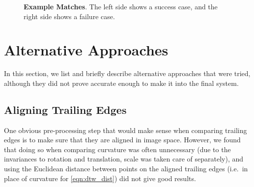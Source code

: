 \begin{figure}[t]%
\centering
{}
\newline
{}
\newline
{}
\newline
{}
\newline
{}
\newline
{}
\caption{\textbf{Example Matches}. The left side shows a success case, and the right side shows a failure case.} 
\label{fig:example_match}
\end{figure}

\section{Alternative Approaches}

In this section, we list and briefly describe alternative approaches that were tried, although they did not prove accurate enough to make it into the final system.

\subsection{Aligning Trailing Edges}

One obvious pre-processing step that would make sense when comparing trailing edges is to make sure that they are aligned in image space.
However, we found that doing so when comparing curvature was often unnecessary (due to the invariances to rotation and translation, scale was taken care of separately), and using the Euclidean distance between points on the aligned trailing edges (i.e.\ in place of curvature for \eqref{eqn:dtw_dist}) did not give good results.

